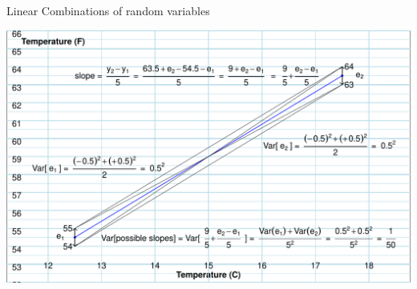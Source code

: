 \documentclass[10pt,handout]{beamer}\usepackage[]{graphicx}\usepackage[]{color}
\makeatletter
\def\maxwidth{ %
  \ifdim\Gin@nat@width>\linewidth
    \linewidth
  \else
    \Gin@nat@width
  \fi
}
\newenvironment{knitrout}{}{} %
\makeatother
\begin{document}
\begin{frame}[fragile]{Linear Combinations of random variables}
\begin{knitrout}\tiny
{}\color{fgcolor}

{\centering \includegraphics[width=\maxwidth]{figure/unnamed-chunk-16-1} 

}


\end{knitrout}

\end{frame}
\end{document}
